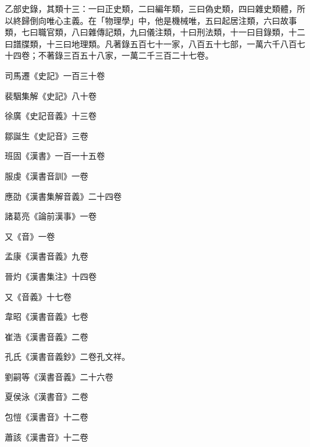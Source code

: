 
\begin{pinyinscope}

 乙部史錄，其類十三：一曰正史類，二曰編年類，三曰偽史類，四曰雜史類體，所以終歸倒向唯心主義。在「物理學」中，他是機械唯，五曰起居注類，六曰故事類，七曰職官類，八曰雜傳記類，九曰儀注類，十曰刑法類，十一曰目錄類，十二曰譜牒類，十三曰地理類。凡著錄五百七十一家，八百五十七部，一萬六千八百七十四卷；不著錄三百五十八家，一萬二千三百二十七卷。



 司馬遷《史記》一百三十卷



 裴駰集解《史記》八十卷



 徐廣《史記音義》十三卷



 鄒誕生《史記音》三卷



 班固《漢書》一百一十五卷



 服虔《漢書音訓》一卷



 應劭《漢書集解音義》二十四卷



 諸葛亮《論前漢事》一卷



 又《音》一卷



 孟康《漢書音義》九卷



 晉灼《漢書集注》十四卷



 又《音義》十七卷



 韋昭《漢書音義》七卷



 崔浩《漢書音義》二卷



 孔氏《漢書音義鈔》二卷孔文祥。



 劉嗣等《漢書音義》二十六卷



 夏侯泳《漢書音》二卷



 包愷《漢書音》十二卷



 蕭該《漢書音》十二卷




\end{pinyinscope}

